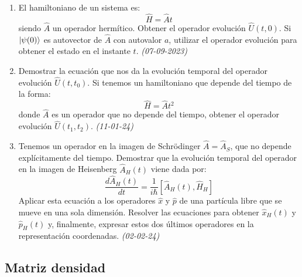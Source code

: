 \begin{enumerate}
    \item El hamiltoniano de un sistema es:
    \[
    \hat{H} = \hat{A}t
    \]
    siendo $\hat{A}$ un operador hermítico. Obtener el operador evolución $\hat{U}(t, 0)$. Si $\ket{\psi(0)}$ es autovector de $\hat{A}$ con autovalor $a$, utilizar el operador evolución para obtener el estado en el instante $t$. \textit{(07-09-2023)}    

    \item Demostrar la ecuación que nos da la evolución temporal del operador evolución $\hat{U}(t, t_0)$. Si tenemos un hamiltoniano que depende del tiempo de la forma:
    \[
    \hat{H} = \hat{A} t^2
    \]
    donde $\hat{A}$ es un operador que no depende del tiempo, obtener el operador evolución $\hat{U}(t_1, t_2)$. \textit{(11-01-24)}

    \item Tenemos un operador en la imagen de Schrödinger $\hat{A} = \hat{A}_S$, que no depende explícitamente del tiempo. Demostrar que la evolución temporal del operador en la imagen de Heisenberg $\hat{A}_H (t)$ viene dada por:
    \[
    \frac{d\hat{A}_H(t)}{dt} = \frac{1}{i \hbar} \left[ \hat{A}_H(t), \hat{H}_H \right]
    \]
    Aplicar esta ecuación a los operadores $\hat{x}$ y $\hat{p}$ de una partícula libre que se mueve en una sola dimensión. Resolver las ecuaciones para obtener $\hat{x}_H(t)$ y $\hat{p}_H(t)$ y, finalmente, expresar estos dos últimos operadores en la representación coordenadas. \textit{(02-02-24)}

\end{enumerate}

\subsection*{Matriz densidad}

